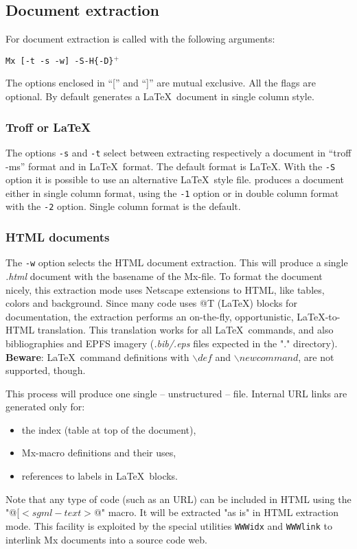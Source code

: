 \subsection{Document extraction}

For document extraction \Mx is called with the following arguments:

\noindent
\begin{center}
	{\tt Mx [-t -s -w] -S\file [-1 -2] -H\n  \{-D\macro\}$^+$\mxfile}
\end{center}

The options enclosed in ``['' and ``]'' are mutual exclusive. 
All the flags are optional. By default \Mx generates a \LaTeX\
document in single column style.

\subsubsection{Troff or \LaTeX}
The options {\tt -s} and {\tt -t} select between extracting 
respectively a document in ``troff -ms'' format and in \LaTeX\ format.
The default format is \LaTeX. With the {\tt -S\file} option
it is possible to use an alternative \LaTeX\ style file. 
\Mx produces a document either in single column format, using the
{\tt -1} option or in double column format with the {\tt -2} option.
Single column format is the default.

\subsubsection{HTML documents}
The {\tt -w} option selects the HTML document extraction. This will
produce a single {\em .html} document with the basename of the Mx-file. To
format the document nicely, this extraction mode uses Netscape extensions
to HTML, like tables, colors and background.  Since many code uses @T 
(\LaTeX) blocks for documentation, the extraction performs an on-the-fly,
opportunistic, \LaTeX-to-HTML translation. This translation
works for all \LaTeX\ commands, and also bibliographies and EPFS imagery
({\em .bib/.eps} files expected in the "." directory). {\bf Beware}:
\LaTeX\ command definitions with $\backslash def$ and
$\backslash newcommand$, are not supported, though.

This process will produce one single -- unstructured -- file. Internal
URL links are generated only for: 
\begin{itemize}
\item the index (table at top of the document),
\item Mx-macro definitions and their uses, 
\item references to labels in \LaTeX\ blocks.
\end{itemize}
Note that any type of code (such as an URL) can be included in HTML
using the "@[$<sgml-text>$@" macro. It will be extracted "as is" in HTML
extraction mode. This facility is exploited by the special utilities 
{\tt WWWidx} and {\tt WWWlink} to interlink Mx documents into a source code
web.

